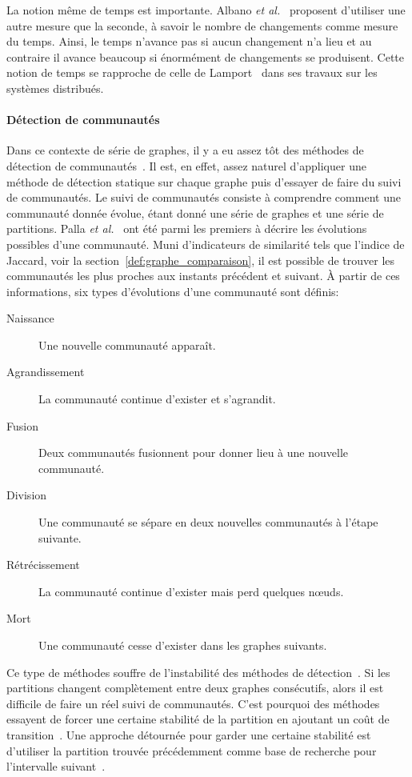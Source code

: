 La notion même de temps est importante.
Albano \emph{et al.}~\cite{Albano2014} proposent d'utiliser une autre mesure que la seconde, à savoir le nombre de changements comme mesure du temps.
Ainsi, le temps n'avance pas si aucun changement n'a lieu et au contraire il avance beaucoup si énormément de changements se produisent.
Cette notion de temps se rapproche de celle de Lamport~\cite{Lamport1978} dans ses travaux sur les systèmes distribués.

\paragraph{Détection de communautés}
Dans ce contexte de série de graphes, il y a eu assez tôt des méthodes de détection de communautés~\cite{Hopcroft2004,Sun2007,Lin2008,Asur2009}.
Il est, en effet, assez naturel d'appliquer une méthode de détection statique sur chaque graphe puis d'essayer de faire du suivi de communautés.
Le suivi de communautés consiste à comprendre comment une communauté donnée évolue, étant donné une série de graphes et une série de partitions.
Palla \emph{et al.}~\cite{Palla2007} ont été parmi les premiers à décrire les évolutions possibles d'une communauté.
Muni d'indicateurs de similarité tels que l'indice de Jaccard, voir la section~\ref{def:graphe_comparaison}, il est possible de trouver les communautés les plus proches aux instants précédent et suivant.
\`A partir de ces informations, six types d'évolutions d'une communauté sont définis:
\begin{description}
\item[Naissance] Une nouvelle communauté apparaît.
\item[Agrandissement] La communauté continue d'exister et s'agrandit.
\item[Fusion] Deux communautés fusionnent pour donner lieu à une nouvelle communauté.
\item[Division] Une communauté se sépare en deux nouvelles communautés à l'étape suivante.
\item[Rétrécissement] La communauté continue d'exister mais perd quelques n\oe{}uds.
\item[Mort] Une communauté cesse d'exister dans les graphes suivants.
\end{description}

Ce type de méthodes souffre de l'instabilité des méthodes de détection~\cite{Aynaud2010,Harenberg2014a}.
Si les partitions changent complètement entre deux graphes consécutifs, alors il est difficile de faire un réel suivi de communautés.
C'est pourquoi des méthodes essayent de forcer une certaine stabilité de la partition en ajoutant un coût de transition~\cite{Chakrabarti2006,Chen2013,Kalavathi2015}.
Une approche détournée pour garder une certaine stabilité est d'utiliser la partition trouvée précédemment comme base de recherche pour l'intervalle suivant~\cite{Aynaud2010,Lancichinetti2011a}.


